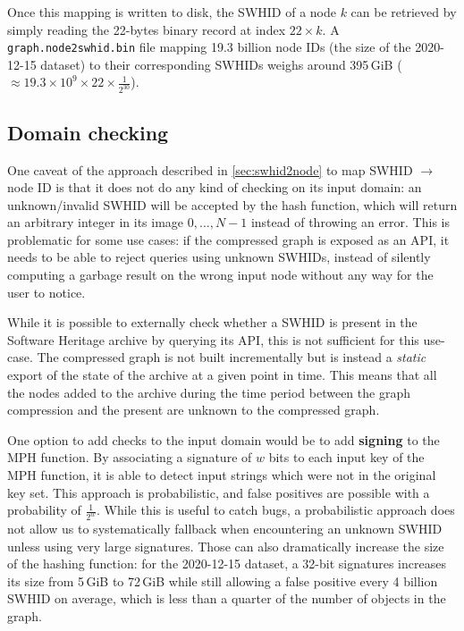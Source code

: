 Once this mapping is written to disk, the \gls{SWHID} of a node $k$ can be
retrieved by simply reading the 22-bytes binary record at index $22 \times k$.
A \texttt{graph.node2swhid.bin} file mapping 19.3 billion node IDs (the size of
the 2020-12-15 dataset) to their corresponding \glspl{SWHID} weighs
around 395\,GiB ($\approx 19.3 \times 10^9 \times 22 \times \frac{1}{2^{30}}$).

\subsection{Domain checking}

One caveat of the approach described in \cref{sec:swhid2node} to map
\gls{SWHID} $\to$ node ID is that it does not do any kind of checking on its
input domain: an unknown/invalid \gls{SWHID} will be accepted by the hash
function, which will return an arbitrary integer in its image ${0,\ldots,N-1}$
instead of throwing an error. This is problematic for some use cases: if the
compressed graph is exposed as an API, it needs to be able to reject queries
using unknown \glspl{SWHID}, instead of silently computing a garbage result on
the wrong input node without any way for the user to notice.

While it is possible to externally check whether a \gls{SWHID} is present in
the Software Heritage archive by querying its API, this is not sufficient for
this use-case. The compressed graph is not built incrementally but is instead a
\emph{static} export of the state of the archive at a given point in time. This
means that all the nodes added to the archive during the time period between
the graph compression and the present are unknown to the compressed graph.

One option to add checks to the input domain would be to add \textbf{signing} to
the \gls{MPH} function. By associating a signature of $w$ bits to each input
key of the \gls{MPH} function, it is able to detect input strings which were
not in the original key set. This approach is probabilistic, and false
positives are possible with a probability of {\Large $\frac{1}{2^w}$}. While
this is useful to catch bugs, a probabilistic approach does not allow us to
systematically fallback when encountering an unknown \gls{SWHID} unless using
very large signatures. Those can also dramatically increase the size of the
hashing function: for the 2020-12-15 dataset, a 32-bit signatures increases its
size from 5\,GiB to 72\,GiB while still allowing a false positive every 4
billion \gls{SWHID} on average, which is less than a quarter of the number of
objects in the graph.

